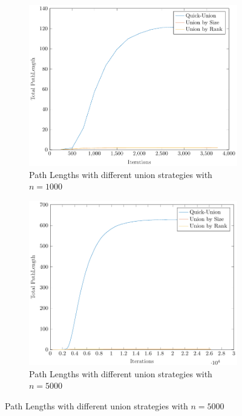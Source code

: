 \begin{figure}[ht]
    \centering
    \begin{subfigure}{0.32\textwidth}
        \centering
        \includegraphics[width=\textwidth]{../images/plotNCFull1000_PathLength.pdf}
        \caption{Path Lengths with different union strategies with $n = 1000$}
    \end{subfigure}%
    \hfill
    \begin{subfigure}{0.32\textwidth}
        \centering
        \includegraphics[width=\textwidth]{../images/plotNCFull5000_PathLength.pdf}
        \caption{Path Lengths with different union strategies with $n = 5000$}

\end{subfigure}
\end{figure}
